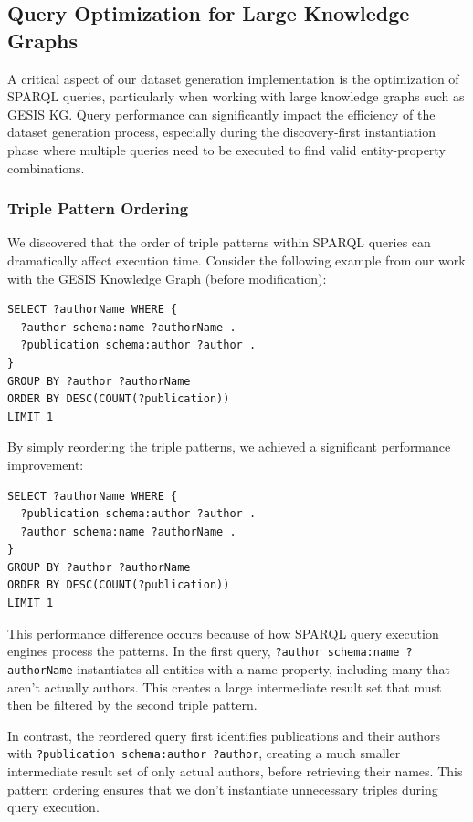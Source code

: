 \subsection{Query Optimization for Large Knowledge Graphs}
\label{query-optimization}

A critical aspect of our dataset generation implementation is the optimization of SPARQL queries, particularly when working with large knowledge graphs such as GESIS KG. Query performance can significantly impact the efficiency of the dataset generation process, especially during the discovery-first instantiation phase where multiple queries need to be executed to find valid entity-property combinations.

\subsubsection{Triple Pattern Ordering}

We discovered that the order of triple patterns within SPARQL queries can dramatically affect execution time. Consider the following example from our work with the GESIS Knowledge Graph (before modification):

\begin{lstlisting}[language=SPARQL, caption=Original query - execution time: 2.155 seconds]
SELECT ?authorName WHERE {
  ?author schema:name ?authorName .
  ?publication schema:author ?author .
}
GROUP BY ?author ?authorName
ORDER BY DESC(COUNT(?publication))
LIMIT 1
\end{lstlisting}

By simply reordering the triple patterns, we achieved a significant performance improvement:

\begin{lstlisting}[language=SPARQL, caption=Reordered query - execution time: 0.698 seconds]
SELECT ?authorName WHERE {
  ?publication schema:author ?author .
  ?author schema:name ?authorName .
}
GROUP BY ?author ?authorName
ORDER BY DESC(COUNT(?publication))
LIMIT 1
\end{lstlisting}

This performance difference occurs because of how SPARQL query execution engines process the patterns. In the first query, \texttt{?author schema:name ?authorName} instantiates all entities with a name property, including many that aren't actually authors. This creates a large intermediate result set that must then be filtered by the second triple pattern.

In contrast, the reordered query first identifies publications and their authors with \texttt{?publication schema:author ?author}, creating a much smaller intermediate result set of only actual authors, before retrieving their names. This pattern ordering ensures that we don't instantiate unnecessary triples during query execution.

